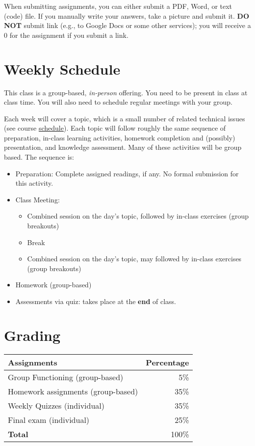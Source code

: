 \documentclass[11pt]{article}
\begin{document}
When submitting assignments, you can either submit a PDF, Word, or text (code) file.  If you manually write your answers, take a picture and submit it.  \textbf{DO NOT} submit link (e.g., to Google Docs or some other services); you will receive a 0 for the assignment if you submit a link.

\section{Weekly Schedule}

This class is a group-based, \emph{in-person} offering. You need to be
present in class at class time. You will also need to schedule regular
meetings with your group.

Each week will cover a topic, which is a small number of related
technical issues (see course \href{https://nguyenthanhvuh.github.io/class-oo/assignments}{schedule}). Each
topic will follow roughly the same sequence of preparation, in-class
learning activities, homework completion and (possibly) presentation,
and knowledge assessment. Many of these activities will be group based.
The sequence is:

\begin{itemize}
\item
  Preparation: Complete assigned readings, if
  any. No formal submission for this activity.
\item
  Class Meeting:

  \begin{itemize}
  \item
    Combined session on the day's topic, followed by
    in-class exercises (group breakouts)
  \item
    Break
  \item
    Combined session on the day's topic, may followed by
    in-class exercises (group breakouts)
  \end{itemize}
\item
  Homework (group-based)
\item
  Assessments via quiz: takes place at the \textbf{end} of class.
\end{itemize}

\section{Grading}\label{sec:grading}

\begin{center}
\begin{tabular}{lr}
\textbf{Assignments} & \textbf{Percentage} \\
\hline
Group Functioning (group-based) & 5\% \\
Homework assignments (group-based) & 35\% \\
Weekly Quizzes (individual) & 35\% \\
  Final exam (individual) & 25\% \\
  \hline
    \textbf{Total} & 100\% \\
\end{tabular}
\end{center}
\end{document}
